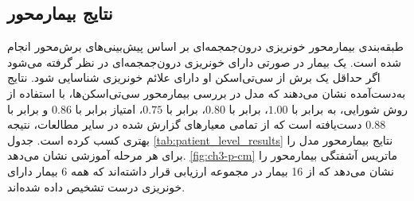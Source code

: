 \subsection{نتایج بیمارمحور}

طبقه‌بندی بیمارمحور خونریزی درون‌جمجمه‌ای بر اساس پیش‌بینی‌های برش‌محور انجام شده است. یک بیمار در صورتی دارای خونریزی درون‌جمجمه‌ای در نظر گرفته می‌شود اگر حداقل یک برش از سی‌تی‌اسکن او دارای علائم خونریزی شناسایی شود. نتایج به‌دست‌آمده نشان می‌دهند که مدل 
 در بررسی بیمارمحور سی‌تی‌اسکن‌ها، با استفاده از روش شورایی، به 
  برابر با
   $1.00$، 
برابر با
     $0.80$، 
      برابر با
       $0.75$،
        امتیاز
          برابر با
           $0.86$
            و 
             برابر با
              $0.88$ 
              دست‌یافته است که از تمامی معیارهای گزارش شده در سایر مطالعات، نتیجه بهتری کسب کرده است.
جدول \ref{tab:patient_level_results} نتایج بیمارمحور مدل  را برای هر مرحله آموزشی نشان می‌دهد.
\autoref{fig:ch3-p-cm}
ماتریس آشفتگی بیمارمحور را نشان می‌دهد که از 16 بیمار در مجموعه ارزیابی قرار داشته‌اند که همه 6 بیمار دارای خونریزی درست تشخیص داده شده‌اند.

